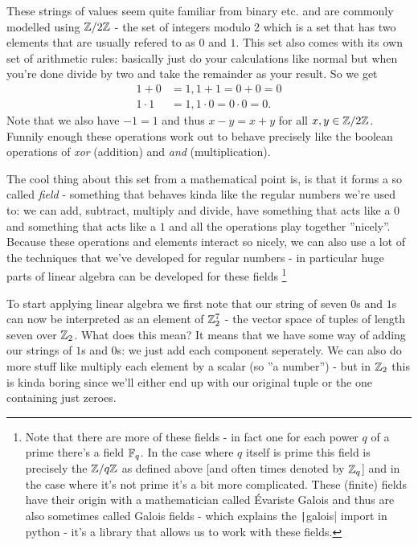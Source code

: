 \documentclass[a4paper,11pt]{article}
\begin{document}
These strings of values seem quite familiar from binary etc. and are commonly modelled using $\mathbb{Z} / 2 \mathbb{Z}$ - the set of integers modulo 2 which is a set that has two elements that are usually refered to as $0$ and $1$. This set also comes with its own set of arithmetic rules: basically just do your calculations like normal but when you're done divide by two and take the remainder as your result. So we get \begin{align*}1+0&=1, 1+1=0+0=0 \\ 1\cdot1&=1, 1\cdot0=0\cdot0=0.\end{align*} Note that we also have $-1=1$ and thus $x-y=x+y$ for all $x,y \in \mathbb{Z} / 2\mathbb{Z}$. Funnily enough these operations work out to behave precisely like the boolean operations of \emph{xor} (addition) and \emph{and} (multiplication).

The cool thing about this set from a mathematical point is, is that it forms a so called \emph{field} - something that behaves kinda like the regular numbers we're used to: we can add, subtract, multiply and divide, have something that acts like a $0$ and something that acts like a $1$ and all the operations play together ''nicely''. Because these operations and elements interact so nicely, we can also use a lot of the techniques that we've developed for regular numbers - in particular huge parts of linear algebra can be developed for these fields \footnote{Note that there are more of these fields - in fact one for each power $q$ of a prime there's a field $\mathbb{F}_q$. In the case where $q$ itself is prime this field is precisely the $\mathbb{Z}/q\mathbb{Z}$ as defined above [and often times denoted by $\mathbb{Z}_q$] and in the case where it's not prime it's a bit more complicated. These (finite) fields have their origin with a mathematician called Évariste Galois and thus are also sometimes called Galois fields - which explains the \texttt|galois| import in python - it's a library that allows us to work with these fields.}

To start applying linear algebra we first note that our string of seven $0$s and $1$s can now be interpreted as an element of $\mathbb{Z}_2^7$ - the vector space of tuples of length seven over $\mathbb{Z}_2$. What does this mean? It means that we have some way of adding our strings of $1$s and $0$s: we just add each component seperately. We can also do more stuff like multiply each element by a scalar (so ''a number'') - but in $\mathbb{Z}_2$ this is kinda boring since we'll either end up with our original tuple or the one containing just zeroes.
\end{document}
